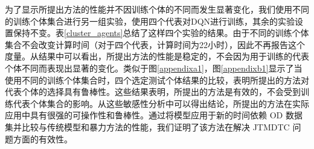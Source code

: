 为了显示所提出方法的性能并不因训练个体的不同而发生显著变化，我们使用不同的训练个体集合进行另一组实验，使用四个代表对DQN进行训练，其余的实验设置保持不变。表\ref{cluster_agents}总结了这样四个实验的结果。由于不同的训练个体集合不会改变计算时间（对于四个代表，计算时间为22小时），因此不再报告这个度量。从结果中可以看出，所提出方法的性能是稳定的，不会因为用于训练的代表个体不同而表现出显著的变化。类似于图\ref{appendixa1}，图\ref{appendixb1}显示了当使用不同的训练个体集合时，四个选定测试个体结果的比较，表明所提出的方法对代表个体的选择具有鲁棒性。这些结果表明，所提出的方法是有效的，不会受到训练代表个体集合的影响。从这些敏感性分析中可以得出结论，所提出的方法在实际应用中具有很强的可操作性和鲁棒性。通过将模型应用于新的时间依赖 OD 数据集并比较与传统模型和暴力方法的性能，我们证明了该方法在解决 JTMDTC 问题方面的有效性。

\begin{figure}[htbp]
  \quad\quad
  \\
  \quad\quad

\end{figure}
